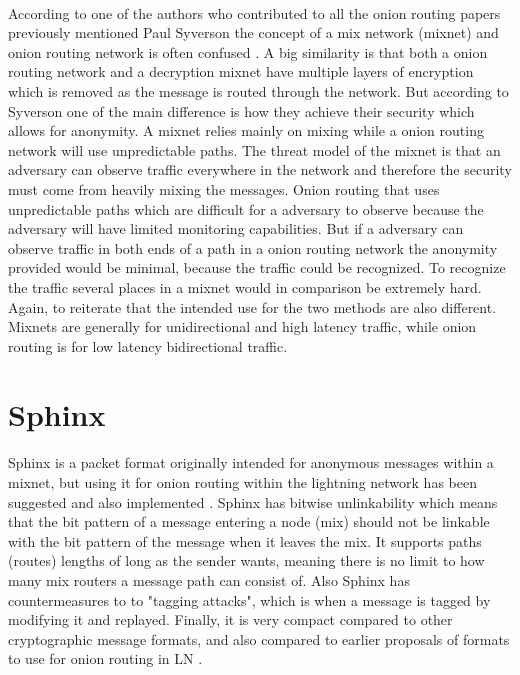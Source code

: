 \documentclass[informationsecurity]{gucmasterproject}
\begin{document}
\paragraph{}
According to one of the authors who contributed to all the onion routing papers previously mentioned Paul Syverson the concept of a mix network (mixnet) and onion routing network is often confused \cite{syverson2009m}.
A big similarity is that both a onion routing network and a decryption mixnet have multiple layers of encryption which is removed as the message is routed through the network.
But according to Syverson one of the main difference is how they achieve their security which allows for anonymity. 
A mixnet relies mainly on mixing while a onion routing network will use unpredictable paths. The threat model of the mixnet is that an adversary can observe traffic everywhere in the network and therefore the security must come from heavily mixing the messages. Onion routing that uses unpredictable paths which are difficult for a adversary to observe because the adversary will have limited monitoring capabilities. But if a adversary can observe traffic in both ends of a path in a onion routing network the anonymity provided would be minimal, because the traffic could be recognized. To recognize the traffic several places in a mixnet would in comparison be extremely hard. Again, to reiterate that the intended use for the two methods are also different. Mixnets are generally for unidirectional and high latency traffic, while onion routing is for low latency bidirectional traffic.


\section{Sphinx}

Sphinx \cite{danezis2009sphinx} is a packet format originally intended for anonymous messages within a mixnet, but using it for onion routing within the lightning network has been suggested \cite{LNDM_onion} \cite{SB_onion} and also implemented \cite{LN_onion_implementation}.
Sphinx has bitwise unlinkability which means that the bit pattern of a message entering a node (mix) should not be linkable with the bit pattern of the message when it leaves the mix. It supports paths (routes) lengths of long as the sender wants, meaning there is no limit to how many mix routers a message path can consist of. Also Sphinx has countermeasures to to "tagging attacks", which is when a message is tagged by modifying it and replayed. Finally, it is very compact compared to other cryptographic message formats, and also compared to earlier proposals of formats to use for onion routing in LN \cite{LNDM_onion}.
\end{document}

